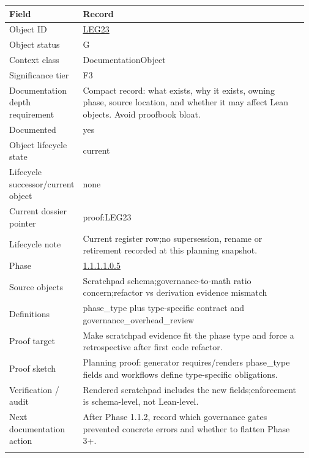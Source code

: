 \begin{longtable}{L{0.16\linewidth} L{0.81\linewidth}}
\hline
\textbf{Field} & \textbf{Record}\\
\hline
Object ID & \hyperlink{object-row-LEG23}{LEG23}\\
\hline\addlinespace[0.20em]
Object status & G\\
\hline\addlinespace[0.20em]
Context class & DocumentationObject\\
\hline\addlinespace[0.20em]
Significance tier & F3\\
\hline\addlinespace[0.20em]
Documentation depth requirement & Compact record: what exists, why it exists, owning phase, source location, and whether it may affect Lean objects. Avoid proofbook bloat.\\
\hline\addlinespace[0.20em]
Documented & yes\\
\hline\addlinespace[0.20em]
Object lifecycle state & current\\
\hline\addlinespace[0.20em]
Lifecycle successor/\allowbreak{}current object & none\\
\hline\addlinespace[0.20em]
Current dossier pointer & proof:LEG23\\
\hline\addlinespace[0.20em]
Lifecycle note & Current register row;\newline no supersession, rename or retirement recorded at this planning snapshot.\\
\hline\addlinespace[0.20em]
Phase & \hyperlink{phase-row-1-1-1-1-0-5}{1.1.1.1.0.5}\\
\hline\addlinespace[0.20em]
Source objects & Scratchpad schema;\newline governance-to-math ratio concern;\newline refactor vs derivation evidence mismatch\\
\hline\addlinespace[0.20em]
Definitions & phase\_type plus type-specific contract and governance\_overhead\_review\\
\hline\addlinespace[0.20em]
Proof target & Make scratchpad evidence fit the phase type and force a retrospective after first code refactor.\\
\hline\addlinespace[0.20em]
Proof sketch & Planning proof: generator requires/\allowbreak{}renders phase\_type fields and workflows define type-specific obligations.\\
\hline\addlinespace[0.20em]
Verification /\allowbreak{} audit & Rendered scratchpad includes the new fields;\newline enforcement is schema-level, not Lean-level.\\
\hline\addlinespace[0.20em]
Next documentation action & After Phase 1.1.2, record which governance gates prevented concrete errors and whether to flatten Phase 3+.\\
\hline\addlinespace[0.20em]
\end{longtable}

